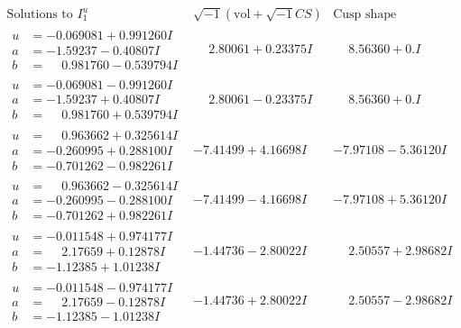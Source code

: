 \documentclass[1p]{elsarticle_modified}
\theoremstyle{definition}
\newcommand{\I}{\sqrt{-1}}
\begin{document}
$$\begin{array}{c|c|c}  
\text{Solutions to }I^u_{1}& \I (\text{vol} + \sqrt{-1}CS) & \text{Cusp shape}\\
 \hline 
\begin{aligned}
u &= -0.069081 + 0.991260 I \\
a &= -1.59237 - 0.40807 I \\
b &= \phantom{-}0.981760 - 0.539794 I\end{aligned}
 & \phantom{-}2.80061 + 0.23375 I & \phantom{-}8.56360 + 0. I\phantom{ +0.000000I} \\ \hline\begin{aligned}
u &= -0.069081 - 0.991260 I \\
a &= -1.59237 + 0.40807 I \\
b &= \phantom{-}0.981760 + 0.539794 I\end{aligned}
 & \phantom{-}2.80061 - 0.23375 I & \phantom{-}8.56360 + 0. I\phantom{ +0.000000I} \\ \hline\begin{aligned}
u &= \phantom{-}0.963662 + 0.325614 I \\
a &= -0.260995 + 0.288100 I \\
b &= -0.701262 - 0.982261 I\end{aligned}
 & -7.41499 + 4.16698 I & -7.97108 - 5.36120 I \\ \hline\begin{aligned}
u &= \phantom{-}0.963662 - 0.325614 I \\
a &= -0.260995 - 0.288100 I \\
b &= -0.701262 + 0.982261 I\end{aligned}
 & -7.41499 - 4.16698 I & -7.97108 + 5.36120 I \\ \hline\begin{aligned}
u &= -0.011548 + 0.974177 I \\
a &= \phantom{-}2.17659 + 0.12878 I \\
b &= -1.12385 + 1.01238 I\end{aligned}
 & -1.44736 - 2.80022 I & \phantom{-}2.50557 + 2.98682 I \\ \hline\begin{aligned}
u &= -0.011548 - 0.974177 I \\
a &= \phantom{-}2.17659 - 0.12878 I \\
b &= -1.12385 - 1.01238 I\end{aligned}
 & -1.44736 + 2.80022 I & \phantom{-}2.50557 - 2.98682 I \\ \hline\begin{aligned}

\end{aligned}
\end{array}$$
\end{document}
